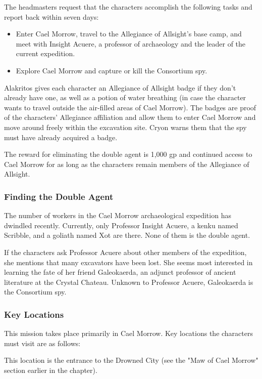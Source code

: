 \documentclass[10pt,a4paper,twoside,bg=print,twocolumn,openany,nodeprecatedcode]{dndbook}
\begin{document}
The headmasters request that the characters accomplish the following tasks and report back within seven days:


\begin{itemize}
\item Enter Cael Morrow, travel to the Allegiance of Allsight's base camp, and meet with Insight Acuere, a professor of archaeology and the leader of the current expedition.
\item Explore Cael Morrow and capture or kill the Consortium spy.
\end{itemize}

Alakritos gives each character an Allegiance of Allsight badge if they don't already have one, as well as a potion of water breathing (in case the character wants to travel outside the air-filled areas of Cael Morrow). The badges are proof of the characters' Allegiance affiliation and allow them to enter Cael Morrow and move around freely within the excavation site. Cryon warns them that the spy must have already acquired a badge.

The reward for eliminating the double agent is 1,000 gp and continued access to Cael Morrow for as long as the characters remain members of the Allegiance of Allsight.

\subsubsection{Finding the Double Agent}
The number of workers in the Cael Morrow archaeological expedition has dwindled recently. Currently, only Professor Insight Acuere, a kenku named Scribble, and a goliath named Xot are there. None of them is the double agent.

If the characters ask Professor Acuere about other members of the expedition, she mentions that many excavators have been lost. She seems most interested in learning the fate of her friend Galeokaerda, an adjunct professor of ancient literature at the Crystal Chateau. Unknown to Professor Acuere, Galeokaerda is the Consortium spy.

\subsubsection{Key Locations}
This mission takes place primarily in Cael Morrow. Key locations the characters must visit are as follows:


\begin{description}[nolistsep]
\item[Maw of Cael Morrow.]
This location is the entrance to the Drowned City (see the "Maw of Cael Morrow" section earlier in the chapter).
\end{description}
\end{document}
